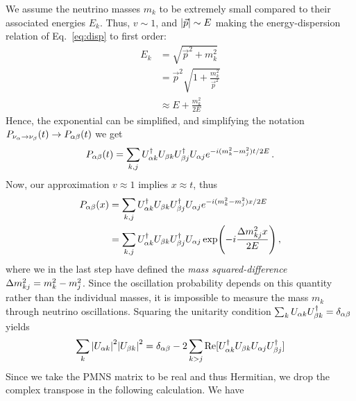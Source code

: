 We assume the neutrino masses $m_k$ to be extremely small compared to their associated energies $E_k$. 
Thus, $v\sim 1$, and $\abs{\vec{p}} \sim E$ making the energy-dispersion relation of Eq.~\ref{eq:disp} to first order:
\begin{align}\label{eq:ultra_rel}
    E_k &= \sqrt{\vec{p}^2 + m_k^2} \nonumber \\
        &= \vec{p}^2\sqrt{1 + \frac{m_k^2}{\vec{p}^2}} \nonumber \\
        &\approx E + \frac{m_k^2}{2E}
\end{align}
Hence, the exponential can be simplified, and simplifying the notation $P_{\nu_\alpha \to \nu_\beta}(t) \to P_{\alpha\beta}(t)$ we get 
\begin{align}
    P_{\alpha\beta}(t) = \sum_{k,j} U^\dagger_{\alpha k}U_{\beta k}U^\dagger_{\beta j}U_{\alpha j} e^{-i(m_k^2-m_j^2)t/2E}\,.
\end{align}
Now, our approximation $v\approx 1$ implies $x\approx t $, thus
\begin{align}
    P_{\ab}(x) &= \sum_{k,j} U^\dagger_{\a k}U_{\b k}U^\dagger_{\b j}U_{\a j} e^{-i(m_k^2-m_j^2)x/2E} \nonumber \\
                       &= \sum_{k,j} U^\dagger_{\a k}U_{\b k}U^\dagger_{\b j}U_{\a j} \exp(-i\frac{\dm_{kj}x}{2E})\,,
\end{align}
where we in the last step have defined the \emph{mass squared-difference} $\dm_{kj} = m_k^2 - m_j^2$. Since the oscillation probability depends on this quantity
rather than the individual masses, it is impossible
to measure the mass $m_k$ through neutrino oscillations.
Squaring the unitarity condition $\sum_k U_{\alpha k}U_{\beta k}^\dagger = \delta_{\alpha \beta}$ yields 
\begin{align}
    \sum_k \abs{U_{\alpha k}}^2\abs{U_{\beta k}}^2 = \delta_{\alpha \beta} - 2 \sum_{k>j}\Re[U_{\alpha k}^\dagger U_{\beta k} U_{\alpha j} U_{\beta j}^\dagger]
\end{align}
Since we take the PMNS matrix to be real and thus Hermitian, we drop the complex transpose in the following calculation. We have

